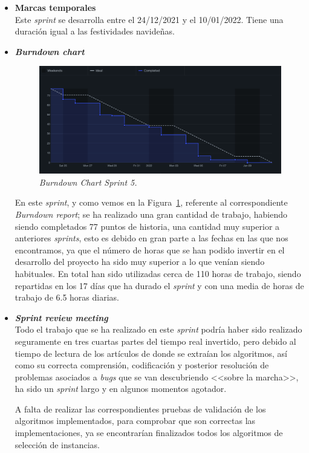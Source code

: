 \begin{itemize}
\item \textbf{Marcas temporales}\\
Este \textit{sprint} se desarrolla entre el 24/12/2021 y el 10/01/2022. Tiene una duración igual a las festividades navideñas.
\item \textbf{\textit{Burndown chart}}\\
\begin{figure}
\begin{center}
\includegraphics[width=\textwidth]{../img/anexos/sprints/BD-Sprint5}
\caption{\textit{Burndown Chart Sprint 5.}}\label{fig:BD-Sprint5}
\end{center}
\end{figure}
En este \textit{sprint}, y como vemos en la Figura~\ref{fig:BD-Sprint5}, referente al correspondiente \textit{Burndown report}; se ha realizado una gran cantidad de trabajo, habiendo siendo completados 77 puntos de historia, una cantidad muy superior a anteriores \textit{sprints}, esto es debido en gran parte a las fechas en las que nos encontramos, ya que el número de horas que se han podido invertir en el desarrollo del proyecto ha sido muy superior a lo que venían siendo habituales. En total han sido utilizadas cerca de 110 horas de trabajo, siendo repartidas en los 17 días que ha durado el \textit{sprint} y con una media de horas de trabajo de 6.5 horas diarias. 

\item \textbf{\textit{Sprint review meeting}}\\
Todo el trabajo que se ha realizado en este \textit{sprint} podría haber sido realizado seguramente en tres cuartas partes del tiempo real invertido, pero debido al tiempo de lectura de los artículos de donde se extraían los algoritmos, así como su correcta comprensión, codificación y posterior resolución de problemas asociados a \textit{bugs} que se van descubriendo <<sobre la marcha>>, ha sido un \textit{sprint} largo y en algunos momentos agotador. 

A falta de realizar las correspondientes pruebas de validación de los algoritmos implementados, para comprobar que son correctas las implementaciones, ya se encontrarían finalizados todos los algoritmos de selección de instancias.

\end{itemize}
